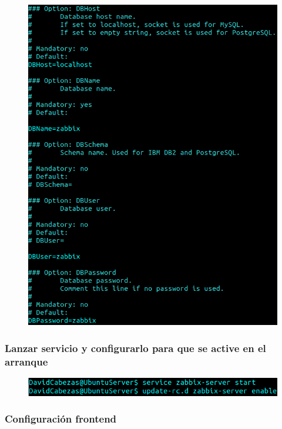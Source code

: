 \documentclass{article}
\begin{document}
\begin{figure}[H]
  \centering
  \includegraphics[width=140mm]{screenshots/server_config-database}
\end{figure}


\subsubsection*{Lanzar servicio y configurarlo para que se active en
  el arranque}

\begin{figure}[H]
  \centering
  \includegraphics[width=140mm]{screenshots/start-boot}
\end{figure}

\subsubsection*{Configuración frontend}
\end{document}
